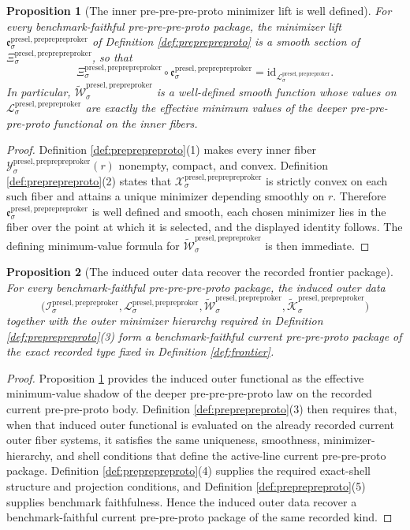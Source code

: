 \documentclass[11pt]{article}
\newcommand{\PrePreProtoKernelSpace}[1]{\mathcal I_{#1}^{\mathrm{presel,prepreproker}}}
\newcommand{\PrePreProtoKernelBody}[1]{\mathcal L_{#1}^{\mathrm{presel,prepreproker}}}
\newcommand{\PrePrePreProtoKernelProj}[1]{\Xi_{#1}^{\mathrm{presel,preprepreproker}}}
\newcommand{\PrePrePreProtoKernelFiber}[2]{\mathcal Y_{#1}^{\mathrm{presel,preprepreproker}}(#2)}
\newcommand{\PrePrePreProtoKernelFunctional}[1]{\mathscr X_{#1}^{\mathrm{presel,preprepreproker}}}
\newcommand{\PrePrePreProtoKernelMinLift}[1]{\mathfrak e_{#1}^{\mathrm{presel,preprepreproker}}}
\newcommand{\InducedPrePreProtoKernelFunctional}[1]{\widetilde{\mathscr W}_{#1}^{\mathrm{presel,prepreproker}}}
\newcommand{\InducedPrePreProtoKernelShell}[1]{\widetilde{\mathcal K}_{#1}^{\mathrm{presel,prepreproker}}}
\newtheorem{proposition}{Proposition}
\begin{document}
\begin{proposition}[The inner pre-pre-pre-proto minimizer lift is well defined]
\label{prop:inner}
For every benchmark-faithful pre-pre-pre-proto package, the minimizer lift \(\PrePrePreProtoKernelMinLift{\sigma}\) of Definition \ref{def:preprepreproto} is a smooth section of \(\PrePrePreProtoKernelProj{\sigma}\), so that
\[
\PrePrePreProtoKernelProj{\sigma}\circ\PrePrePreProtoKernelMinLift{\sigma}
=
\mathrm{id}_{\PrePreProtoKernelBody{\sigma}}.
\]
In particular, \(\InducedPrePreProtoKernelFunctional{\sigma}\) is a well-defined smooth function whose values on \(\PrePreProtoKernelBody{\sigma}\) are exactly the effective minimum values of the deeper pre-pre-pre-proto functional on the inner fibers.
\end{proposition}

\begin{proof}
Definition \ref{def:preprepreproto}(1) makes every inner fiber \(\PrePrePreProtoKernelFiber{\sigma}{r}\) nonempty, compact, and convex. Definition \ref{def:preprepreproto}(2) states that \(\PrePrePreProtoKernelFunctional{\sigma}\) is strictly convex on each such fiber and attains a unique minimizer depending smoothly on \(r\). Therefore \(\PrePrePreProtoKernelMinLift{\sigma}\) is well defined and smooth, each chosen minimizer lies in the fiber over the point at which it is selected, and the displayed identity follows. The defining minimum-value formula for \(\InducedPrePreProtoKernelFunctional{\sigma}\) is then immediate.
\end{proof}

\begin{proposition}[The induced outer data recover the recorded frontier package]
\label{prop:frontier}
For every benchmark-faithful pre-pre-pre-proto package, the induced outer data
\[
\bigl(
\PrePreProtoKernelSpace{\sigma},
\PrePreProtoKernelBody{\sigma},
\InducedPrePreProtoKernelFunctional{\sigma},
\InducedPrePreProtoKernelShell{\sigma}
\bigr)
\]
together with the outer minimizer hierarchy required in Definition \ref{def:preprepreproto}(3) form a benchmark-faithful current pre-pre-proto package of the exact recorded type fixed in Definition \ref{def:frontier}.
\end{proposition}

\begin{proof}
Proposition \ref{prop:inner} provides the induced outer functional as the effective minimum-value shadow of the deeper pre-pre-pre-proto law on the recorded current pre-pre-proto body. Definition \ref{def:preprepreproto}(3) then requires that, when that induced outer functional is evaluated on the already recorded current outer fiber systems, it satisfies the same uniqueness, smoothness, minimizer-hierarchy, and shell conditions that define the active-line current pre-pre-proto package. Definition \ref{def:preprepreproto}(4) supplies the required exact-shell structure and projection conditions, and Definition \ref{def:preprepreproto}(5) supplies benchmark faithfulness. Hence the induced outer data recover a benchmark-faithful current pre-pre-proto package of the same recorded kind.
\end{proof}
\end{document}
